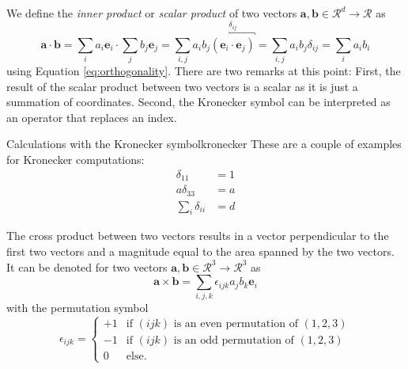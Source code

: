 
We define the \emph{inner product} or \emph{scalar product} of two vectors $\mathbf{a}, \mathbf{b} \in \mathcal{R}^d \rightarrow \mathcal{R}$ as 
\begin{equation}
    \mathbf{a} \cdot \mathbf{b} 
        = \sum_i a_i \mathbf{e}_i \cdot \sum_j b_j \mathbf{e}_j 
        =  \sum_{i,j} a_i b_j \overbracket{(\mathbf{e}_i \cdot \mathbf{e}_j)}^{\delta_{ij}} 
        = \sum_{i,j} a_i b_j \delta_{ij} = \sum_{i} a_i b_i
\end{equation}
using Equation \eqref{eq:orthogonality}.
There are two remarks at this point: First, the result of the scalar product between two vectors is a scalar as it is just a summation of coordinates. Second, the Kronecker symbol can be interpreted as an operator that replaces an index.

\begin{example}{Calculations with the Kronecker symbol}{kronecker}
    These are a couple of examples for Kronecker computations: 
    \begin{align}
        \delta_{11}     &= 1\\
        a \delta_{33}   &= a \\
        \sum_i \delta_{ii} &= d 
    \end{align}
\end{example}

The cross product between two vectors results in a vector perpendicular to the first two vectors and a magnitude equal to the area spanned by the two vectors. It can be denoted for two vectors $\mathbf{a},\mathbf{b} \in \mathcal{R}^3 \rightarrow \mathcal{R}^3$ as 
\begin{equation}
    \mathbf{a} \times \mathbf{b} = \sum_{i,j,k} \epsilon_{ijk} a_j b_k \mathbf{e}_i 
\end{equation}
with the permutation symbol 
\begin{equation}
    \epsilon_{ijk} = 
    \begin{cases}
        +1  & \text{if } (ijk) \text{ is an even permutation of } (1,2,3)\\
        -1  & \text{if } (ijk) \text{ is an odd permutation of } (1,2,3)\\
        0   & \text{else}.
    \end{cases}
\end{equation}

